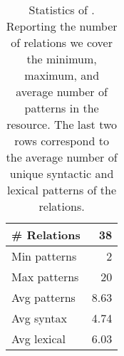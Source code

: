 \begin{table}[t]
    \centering
\begin{tabular}{lr}
  \toprule
    \# Relations &   38 \\
    \midrule
 Min patterns &    2 \\
 Max patterns &   20 \\
 Avg patterns &    8.63 \\
 \midrule
   Avg syntax &    4.74 \\
  Avg lexical &    6.03 \\
\bottomrule
\end{tabular}
    \caption{Statistics of \resource{}. Reporting the number of relations we cover the minimum, maximum, and average number of patterns in the resource.
    The last two rows correspond to the average number of unique syntactic and lexical patterns of the relations.}
    \label{tab:rel-graph-stats}
\end{table}

